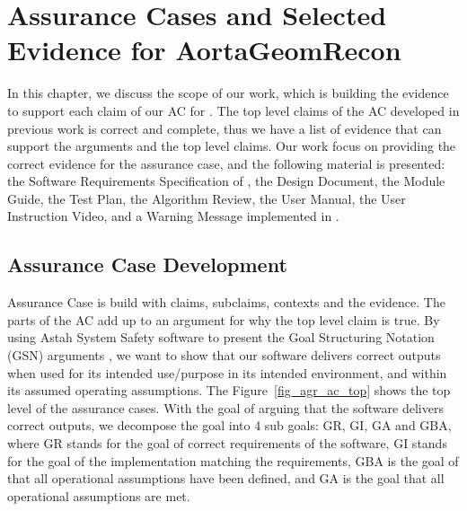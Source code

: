 \chapter{Assurance Cases and Selected Evidence for AortaGeomRecon}

In this chapter, we discuss the scope of our work, which is building the evidence to support each claim of our AC  for \progname{}. The top level claims of the AC developed in previous work \cite{scs_ac} is correct and complete, thus we have a list of evidence that can support the arguments and the top level claims. Our work focus on providing the correct evidence for the assurance case, and the following material is presented: the Software Requirements Specification of \progname{}, the Design Document, the Module Guide, the Test Plan, the Algorithm Review,  the User Manual, the User Instruction Video, and a Warning  Message implemented  in \progname{}.

\section{Assurance Case Development}

Assurance Case is build with claims, subclaims, contexts and the evidence. The parts of  the AC  add up  to an argument for why the top level claim is true. By using Astah System Safety software to present the Goal Structuring Notation (GSN) arguments \cite{Astah_2023}\cite{kelly2004goal}, we want to show that our software delivers correct outputs when used for its intended use/purpose in its intended environment, and within its assumed operating assumptions. The Figure~\ref{fig_agr_ac_top} shows the top level of the assurance cases. With the goal of arguing that the software delivers correct outputs, we decompose the goal into 4 sub goals: GR, GI, GA and GBA, where GR stands for the goal of correct requirements of the software, GI stands for the goal of the implementation  matching the requirements, GBA is the goal of  that all  operational assumptions have been defined, and GA is the goal that all operational assumptions are met.

